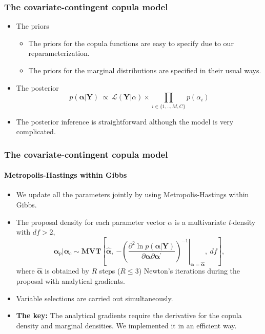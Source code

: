 \documentclass[14pt]{beamer}
\begin{document}
\begin{frame}
  \frametitle{The covariate-contingent copula model}
  \begin{itemize}

  \item The priors

    \begin{itemize}
    \item The priors for the copula functions are easy to specify due to our
      reparameterization.

    \item  The priors for the marginal distributions are specified in their usual
      ways.

    \end{itemize}

  \item The posterior
    \begin{equation*}
      p(\bm{\alpha}|\bm{Y})~ \propto~ \mathcal{L} (\mathbf{Y}| \alpha) \times
      \prod \limits_{i \in \{ {1,..,M,C\}}} p(\alpha_i)
    \end{equation*}

  \item The posterior inference is straightforward although the model is very complicated.

  \end{itemize}
\end{frame}

\begin{frame}
  \frametitle{The covariate-contingent copula model}
  \framesubtitle{Metropolis-Hastings within Gibbs}
  \begin{itemize}
  \item We update all the parameters jointly by using
    Metropolis-Hastings within Gibbs.
  \item The proposal density for each parameter vector $\alpha$ is a multivariate \emph{t}-density with  $df>2$,
    \[
    \bm{\alpha}_{p}|\bm{\alpha}_{c}\sim\bm{MVT}\left[\bm{\hat{\alpha}},~\left.-\left(\frac{\partial^{2}\ln
            p(\bm{\alpha}|\bm{Y})}{\partial\bm{\alpha}\partial\bm{\alpha}^{\prime}}\right)^{-1}\right\vert
      _{\bm{\alpha}=\bm{\hat{\alpha}}},~df\right],
    \]
    where $\bm{\hat{\alpha}}$ is obtained by $R$ steps ($R\leq 3$) Newton's
    iterations during the proposal with analytical gradients.

  \item Variable selections are carried out simultaneously.

  \item \textbf{The key:} The analytical gradients require the derivative for the copula
    density and marginal densities. We implemented it in an efficient way.

  \end{itemize}
\end{frame}
\end{document}
